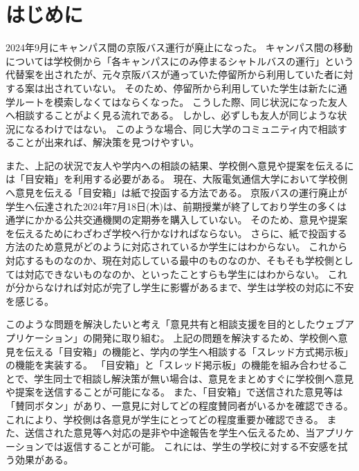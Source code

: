 \documentclass[main]{subfiles}
\begin{document}
\chapter{はじめに}
\label{cha:intro}

2024年9月にキャンパス間の京阪バス運行が廃止になった。
キャンパス間の移動については学校側から「各キャンパスにのみ停まるシャトルバスの運行」という代替案を出されたが、元々京阪バスが通っていた停留所から利用していた者に対する案は出されていない。
そのため、停留所から利用していた学生は新たに通学ルートを模索しなくてはならくなった。
こうした際、同じ状況になった友人へ相談することがよく見る流れである。
しかし、必ずしも友人が同じような状況になるわけではない。
このような場合、同じ大学のコミュニティ内で相談することが出来れば、解決策を見つけやすい。

また、上記の状況で友人や学内への相談の結果、学校側へ意見や提案を伝えるには「目安箱」を利用する必要がある。
現在、大阪電気通信大学において学校側へ意見を伝える「目安箱」は紙で投函する方法である。
京阪バスの運行廃止が学生へ伝達された2024年7月18日(木)は、前期授業が終了しており学生の多くは通学にかかる公共交通機関の定期券を購入していない。
そのため、意見や提案を伝えるためにわざわざ学校へ行かなければならない。
さらに、紙で投函する方法のため意見がどのように対応されているか学生にはわからない。
これから対応するものなのか、現在対応している最中のものなのか、そもそも学校側としては対応できないものなのか、といったことすらも学生にはわからない。
これが分からなければ対応が完了し学生に影響があるまで、学生は学校の対応に不安を感じる。

このような問題を解決したいと考え「意見共有と相談支援を目的としたウェブアプリケーション」の開発に取り組む。
上記の問題を解決するため、学校側へ意見を伝える「目安箱」の機能と、学内の学生へ相談する「スレッド方式掲示板」の機能を実装する。
「目安箱」と「スレッド掲示板」の機能を組み合わせることで、学生同士で相談し解決策が無い場合は、意見をまとめすぐに学校側へ意見や提案を送信することが可能になる。
また、「目安箱」で送信された意見等は「賛同ボタン」があり、一意見に対してどの程度賛同者がいるかを確認できる。
これにより、学校側は各意見が学生にとってどの程度重要か確認できる。
また、送信された意見等へ対応の是非や中途報告を学生へ伝えるため、当アプリケーションでは返信することが可能。
これには、学生の学校に対する不安感を拭う効果がある。
\end{document}
